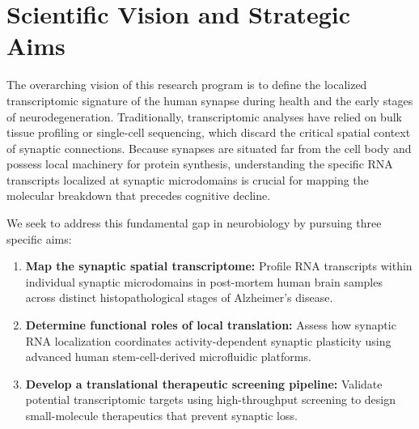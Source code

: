 \section{Scientific Vision and Strategic Aims}

The overarching vision of this research program is to define the localized transcriptomic signature of the human synapse during health and the early stages of neurodegeneration. Traditionally, transcriptomic analyses have relied on bulk tissue profiling or single-cell sequencing, which discard the critical spatial context of synaptic connections. Because synapses are situated far from the cell body and possess local machinery for protein synthesis, understanding the specific RNA transcripts localized at synaptic microdomains is crucial for mapping the molecular breakdown that precedes cognitive decline.

We seek to address this fundamental gap in neurobiology by pursuing three specific aims:
\begin{enumerate}[label=\textbf{\lbrack Aim \arabic*\rbrack}]
    \item \textbf{Map the synaptic spatial transcriptome:} Profile RNA transcripts within individual synaptic microdomains in post-mortem human brain samples across distinct histopathological stages of Alzheimer's disease.
    \item \textbf{Determine functional roles of local translation:} Assess how synaptic RNA localization coordinates activity-dependent synaptic plasticity using advanced human stem-cell-derived microfluidic platforms.
    \item \textbf{Develop a translational therapeutic screening pipeline:} Validate potential transcriptomic targets using high-throughput screening to design small-molecule therapeutics that prevent synaptic loss.
\end{enumerate}
